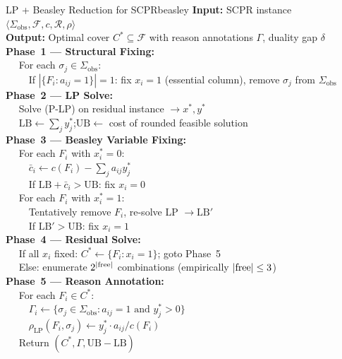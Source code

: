 \documentclass[11pt,a4paper]{report}
\newcommand{\calF}{\mathcal{F}}
\newcommand{\calR}{\mathcal{R}}
\begin{document}
\begin{algorithm_box}{LP + Beasley Reduction for SCPR}{beasley}
\textbf{Input:} SCPR instance $\langle \Sigma_{\mathrm{obs}}, \calF, c, \calR, \rho \rangle$\\
\textbf{Output:} Optimal cover $C^* \subseteq \calF$ with reason annotations $\Gamma$, duality gap $\delta$\\[6pt]
\textbf{Phase~1 --- Structural Fixing:}\\
$\quad$ For each $\sigma_j \in \Sigma_{\mathrm{obs}}$:\\
$\quad\quad$ If $|\{F_i : a_{ij}=1\}| = 1$: fix $x_i = 1$ (essential column), remove $\sigma_j$ from $\Sigma_{\mathrm{obs}}$\\[4pt]
\textbf{Phase~2 --- LP Solve:}\\
$\quad$ Solve (P-LP) on residual instance $\to x^*, y^*$\\
$\quad$ $\mathrm{LB} \leftarrow \sum_j y_j^*$;\quad $\mathrm{UB} \leftarrow$ cost of rounded feasible solution\\[4pt]
\textbf{Phase~3 --- Beasley Variable Fixing:}\\
$\quad$ For each $F_i$ with $x_i^* = 0$:\\
$\quad\quad$ $\bar{c}_i \leftarrow c(F_i) - \sum_j a_{ij} y_j^*$\\
$\quad\quad$ If $\mathrm{LB} + \bar{c}_i > \mathrm{UB}$: fix $x_i = 0$\\
$\quad$ For each $F_i$ with $x_i^* = 1$:\\
$\quad\quad$ Tentatively remove $F_i$, re-solve LP $\to \mathrm{LB}'$\\
$\quad\quad$ If $\mathrm{LB}' > \mathrm{UB}$: fix $x_i = 1$\\[4pt]
\textbf{Phase~4 --- Residual Solve:}\\
$\quad$ If all $x_i$ fixed: $C^* \leftarrow \{F_i : x_i = 1\}$; goto Phase~5\\
$\quad$ Else: enumerate $2^{|{\rm free}|}$ combinations (empirically $|{\rm free}| \leq 3$)\\[4pt]
\textbf{Phase~5 --- Reason Annotation:}\\
$\quad$ For each $F_i \in C^*$:\\
$\quad\quad$ $\Gamma_i \leftarrow \{\sigma_j \in \Sigma_{\mathrm{obs}} : a_{ij}=1 \text{ and } y_j^* > 0\}$\\
$\quad\quad$ $\rho_{\mathrm{LP}}(F_i, \sigma_j) \leftarrow y_j^* \cdot a_{ij} / c(F_i)$\\
$\quad$ Return $(C^*, \Gamma, \mathrm{UB} - \mathrm{LB})$
\end{algorithm_box}
\end{document}
